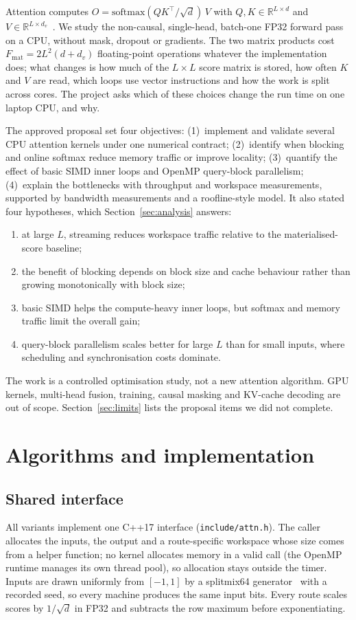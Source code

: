 \documentclass[11pt,a4paper]{article}
\newcommand{\code}[1]{\texttt{#1}}
\begin{document}
Attention computes $O=\mathrm{softmax}(QK^{\top}/\sqrt{d})\,V$ with $Q,K\in\mathbb{R}^{L\times d}$ and $V\in\mathbb{R}^{L\times d_v}$~\cite{vaswani2017}. We study the non-causal, single-head, batch-one FP32 forward pass on a CPU, without mask, dropout or gradients. The two matrix products cost $F_{\mathrm{mat}}=2L^2(d+d_v)$ floating-point operations whatever the implementation does; what changes is how much of the $L\times L$ score matrix is stored, how often $K$ and $V$ are read, which loops use vector instructions and how the work is split across cores. The project asks which of these choices change the run time on one laptop CPU, and why.

The approved proposal set four objectives: (1)~implement and validate several CPU attention kernels under one numerical contract; (2)~identify when blocking and online softmax reduce memory traffic or improve locality; (3)~quantify the effect of basic SIMD inner loops and OpenMP query-block parallelism; (4)~explain the bottlenecks with throughput and workspace measurements, supported by bandwidth measurements and a roofline-style model. It also stated four hypotheses, which Section~\ref{sec:analysis} answers:
\begin{enumerate}[label=\textbf{H\arabic*}]
\item at large $L$, streaming reduces workspace traffic relative to the materialised-score baseline;
\item the benefit of blocking depends on block size and cache behaviour rather than growing monotonically with block size;
\item basic SIMD helps the compute-heavy inner loops, but softmax and memory traffic limit the overall gain;
\item query-block parallelism scales better for large $L$ than for small inputs, where scheduling and synchronisation costs dominate.
\end{enumerate}
The work is a controlled optimisation study, not a new attention algorithm. GPU kernels, multi-head fusion, training, causal masking and KV-cache decoding are out of scope. Section~\ref{sec:limits} lists the proposal items we did not complete.

\section{Algorithms and implementation}\label{sec:impl}

\subsection{Shared interface}
All variants implement one C++17 interface (\code{include/attn.h}). The caller allocates the inputs, the output and a route-specific workspace whose size comes from a helper function; no kernel allocates memory in a valid call (the OpenMP runtime manages its own thread pool), so allocation stays outside the timer. Inputs are drawn uniformly from $[-1,1]$ by a splitmix64 generator~\cite{steele2014} with a recorded seed, so every machine produces the same input bits. Every route scales scores by $1/\sqrt{d}$ in FP32 and subtracts the row maximum before exponentiating.
\end{document}
